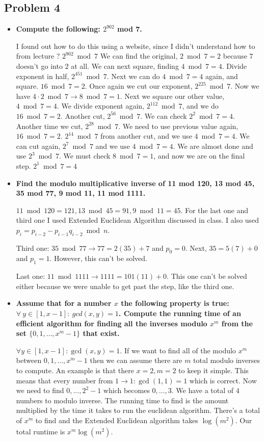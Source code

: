 \documentclass[11pt]{article}
\begin{document}
\subsection*{Problem 4}
\begin{itemize}
\item \textbf{Compute the following: $2^{902}$ mod 7.}

I found out how to do this using a website, since I didn't understand how to from lecture ? $2^{902} \bmod 7$ We can find the original, $2 \bmod 7 = 2$ because $7$ doesn't go into $2$ at all. We can next square, finding $4 \bmod 7 = 4$. Divide exponent in half, $2^{451} \bmod 7$. Next we can do $4 \bmod 7 = 4$ again, and square. $16 \bmod 7 = 2$. Once again we cut our exponent, $2^{225} \bmod 7$. Now we have $4 \cdot 2 \bmod 7 \to 8 \bmod 7 = 1$. Next we square our other value, $4 \bmod 7 = 4$. We divide exponent again, $2^{112} \bmod 7$, and we do $16 \bmod 7 = 2$. Another cut, $2^{56} \bmod 7$. We can check $2^2 \bmod 7 = 4$. Another time we cut, $2^{28} \bmod 7$. We need to use previous value again, $16 \bmod 7 = 2$. $2^{14} \bmod 7$ from another cut, and we use $4 \bmod 7 = 4$. We can cut again, $2^7 \bmod 7$ and we use $4 \bmod 7 = 4$. We are almost done and use $2^3 \bmod 7$. We must check $8 \bmod 7 = 1$, and now we are on the final step. $2^1 \bmod 7 = 4$

\item \textbf{Find the modulo multiplicative inverse of 11 mod 120, 13 mod 45,
  35 mod 77, 9 mod 11, 11 mod 1111.}

$11 \bmod 120 = 121, 13 \bmod 45 = 91, 9 \bmod 11 = 45$. For the last one and third one I used Extended Euclidean Algorithm discussed in class. I also used $p_i = p_{i-2} - p_{i-1} q_{i-2} \bmod n$.


Third one: $35 \bmod 77 \to 77 = 2(35) + 7$ and $p_0 = 0$. Next, $35 = 5(7) + 0$ and $p_1 = 1$. However, this can't be solved.

Last one: $11 \bmod 1111 \to 1111 = 101(11) + 0$. This one can't be solved either because we were unable to get past the step, like the third one.  

\item \textbf{Assume that for a number $x$ the following property is true:
  $\forall\ y \in [1,x-1]:\ gcd(x,y) = 1$. Compute the running time of
  an efficient algorithm for finding all the inverses modulo $x^m$
  from the set $\{0, 1, \ldots, x^m-1\}$ that exist.}
  
$\forall y \in [1,x-1]: \gcd(x,y) = 1$. If we want to find all of the modulo $x^m$ between $0,1,...,x^m -1$ then we can assume there are $m$ total modulo inverses to compute. An example is that there $x = 2, m = 2$ to keep it simple. This means that every number from $1 \to 1: \gcd(1,1) = 1$ which is correct. Now we need to find $0,...,2^2-1$ which becomes $0,...,3$. We have a total of $4$ numbers to modulo inverse. The running time to find is the amount multiplied by the time it takes to run the euclidean algorithm. There's a total of $x^m$ to find and the Extended Euclidean algorithm takes $\log(m^2)$. Our total runtime is $x^m \log(m^2)$.

\end{itemize}
\end{document}
